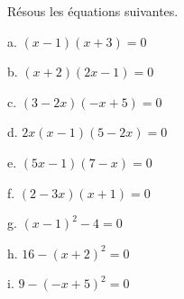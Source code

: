 
Résous les équations suivantes.

\begin{description}
\begin{minipage}{0.3\linewidth}
\item[a. ] $(x-1)(x+3)=0$
\item[b. ] $(x+2)(2x-1)=0$
\item[c. ] $(3-2x)(-x+5)=0$
\end{minipage}
\begin{minipage}{0.3\linewidth}
\item[d. ] $2x(x-1)(5-2x)=0$
\item[e. ] $(5x-1)(7-x)=0$
\item[f. ] $(2-3x)(x+1)=0$
\end{minipage}
\begin{minipage}{0.3\linewidth}
\item[g. ] $(x-1)^2-4=0$
\item[h. ] $16-(x+2)^2=0$
\item[i. ] $9-(-x+5)^2=0$
\end{minipage}
\end{description}